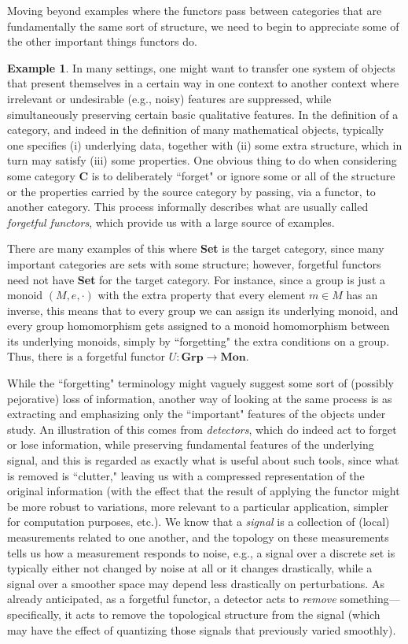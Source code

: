 \documentclass[a4paper]{book}
\theoremstyle{definition}
\newtheorem{example}{Example}[section]
\theoremstyle{definition}
\theoremstyle{definition}
\theoremstyle{theorem}
\theoremstyle{definition}
\begin{document}
Moving beyond examples where the functors pass between categories that are fundamentally the same sort of structure, we need to begin to appreciate some of the other important things functors do. 
\begin{example}
	In many settings, one might want to transfer one system of objects that present themselves in a certain way in one context to another context where irrelevant or undesirable (e.g., noisy) features are suppressed, while simultaneously preserving certain basic qualitative features. In the definition of a category, and indeed in the definition of many mathematical objects, typically one specifies (i) underlying data, together with (ii) some extra structure, which in turn may satisfy (iii) some properties. One obvious thing to do when considering some category $\textbf{C}$ is to deliberately ``forget" or ignore some or all of the structure or the properties carried by the source category by passing, via a functor, to another category. This process informally describes what are usually called \textit{forgetful functors},  which provide us with a large source of examples.\par
	There are many examples of this where \textbf{Set} is the target category, since many important categories are sets with some structure; however, forgetful functors need not have \textbf{Set} for the target category. For instance, since a group is just a monoid $(M, e, \cdot)$ with the extra property that every element $m \in M$ has an inverse, this means that to every group we can assign its underlying monoid, and every group homomorphism gets assigned to a monoid homomorphism between its underlying monoids, simply by ``forgetting" the extra conditions on a group. Thus, there is a forgetful functor $U: \textbf{Grp} \rightarrow \textbf{Mon}$. \par 
	While the ``forgetting" terminology might vaguely suggest some sort of (possibly pejorative) loss of information, another way of looking at the same process is as extracting and emphasizing only the ``important" features of the objects under study. An illustration of this comes from \textit{detectors},  which do indeed act to forget or lose information, while preserving fundamental features of the underlying signal, and this is regarded as exactly what is useful about such tools, since what is removed is ``clutter," leaving us with a compressed representation of the original information (with the effect that the result of applying the functor might be more robust to variations, more relevant to a particular application, simpler for computation purposes, etc.). We know that a \textit{signal} is a collection of (local) measurements related to one another, and the topology on these measurements tells us how a measurement responds to noise, e.g., a signal over a discrete set is typically either not changed by noise at all or it changes drastically, while a signal over a smoother space may depend less drastically on perturbations. As already anticipated, as a forgetful functor, a detector acts to \textit{remove} something---specifically, it acts to remove the topological structure from the signal (which may have the effect of quantizing those signals that previously varied smoothly). \par 

\end{example}
\end{document}
